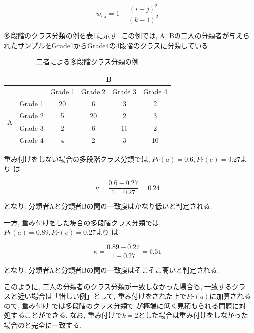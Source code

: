 \documentclass[12pt]{jarticle}
\begin{document}
\begin{equation}
w_{i, j} = 1 - \frac{(i - j)^2}{(k-1)^2}
\end{equation}

多段階のクラス分類の例を表\ref{classifi_4}に示す. 
この例では, A, Bの二人の分類者が与えられたサンプルをGrade1からGrade4の4段階のクラスに分類している. 

\begin{table}
\begin{center}
\caption{二者による多段階クラス分類の例}
\label{classifi_4}
\begin{tabular}[t]{|c|c|c|c|c|c|}
  \hline
  \multirow{2}{*}{} & & \multicolumn{4}{|c|}{B} \\ \hline
                            &   & Grade 1 & Grade 2 & Grade 3 & Grade 4 \\ \hline
  \multirow{4}{*}{A} & Grade 1  & 20 &  6 &  3 &  2   \\ \cline{2-6}
                     & Grade 2  &  5 & 20 &  2 &  3   \\ \cline{2-6}
                     & Grade 3  &  2 &  6 & 10 &  2   \\ \cline{2-6}
                     & Grade 4  &  4 &  2 &  3 &  10   \\ \hline
\end{tabular}
\end{center}
\end{table}

重み付けをしない場合の多段階クラス分類では, $Pr(a) = 0.6, Pr(e) = 0.27$より \kappac は

\begin{equation}
  \kappa = \frac{0.6 - 0.27}{1 - 0.27} = 0.24
\end{equation}

となり, 分類者Aと分類者Bの間の一致度はかなり低いと判定される. 

一方, 重み付けをした場合の多段階クラス分類では, $Pr(a) = 0.89, Pr(e) = 0.27$より \kappac は

\begin{equation}
  \kappa = \frac{0.89 - 0.27}{1 - 0.27} = 0.51
\end{equation}

となり, 分類者Aと分類者Bの間の一致度はそこそこ高いと判定される. 

このように, 二人の分類者のクラス分類が一致しなかった場合も, 一致するクラスと近い場合は「惜しい例」として, 重み付けをされた上で$Pr(a)$に加算されるので, 重み付け \kappac では多段階のクラス分類で \kappac が極端に低く見積もられる問題に対処することができる. 
なお, 重み付け\kappac で$k=2$とした場合は重み付けをしなかった場合の\kappac と完全に一致する. 
\end{document}
